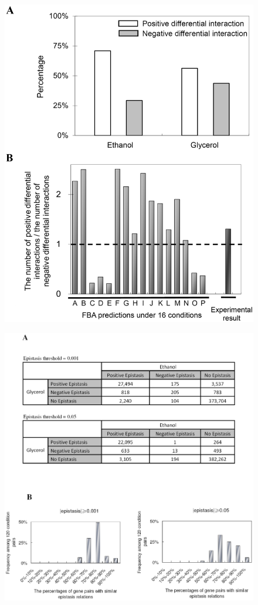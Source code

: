 \documentclass{article}
\begin{document}
\begin{figure}[H]
\caption{}
\label{fig:eefS2}
\centering
\includegraphics[width=\textwidth]{envFigure_S2}
\end{figure}

\begin{figure}[H]
\caption{}
\label{fig:eefS3}
\centering
\includegraphics[width=\textwidth]{envFigure_S3}
\end{figure}
\end{document}
